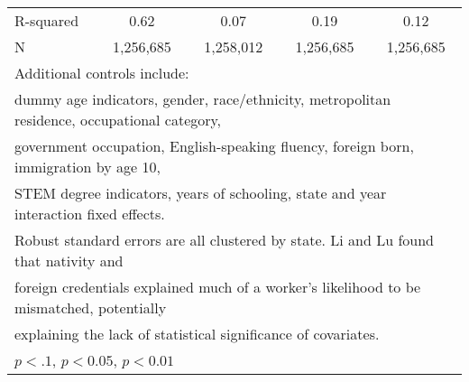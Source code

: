 \begin{table}[htbp]
\begin{tabular}{l*{4}{c}}
R-squared           &        0.62         &        0.07         &        0.19         &        0.12         \\
N                   &   1,256,685         &   1,258,012         &   1,256,685         &   1,256,685         \\
\bottomrule
\multicolumn{5}{l}{\footnotesize Additional controls include:}\\
\multicolumn{5}{l}{\footnotesize dummy age indicators, gender, race/ethnicity, metropolitan residence, occupational category,}\\
\multicolumn{5}{l}{\footnotesize government occupation, English-speaking fluency, foreign born, immigration by age 10,}\\
\multicolumn{5}{l}{\footnotesize STEM degree indicators, years of schooling, state and year interaction fixed effects.}\\
\multicolumn{5}{l}{\footnotesize Robust standard errors are all clustered by state. Li and Lu found that nativity and}\\
\multicolumn{5}{l}{\footnotesize foreign credentials explained much of a worker's likelihood to be mismatched, potentially}\\
\multicolumn{5}{l}{\footnotesize explaining the lack of statistical significance of covariates.}\\
\multicolumn{5}{l}{\footnotesize \sym{*} \(p<.1\), \sym{**} \(p<0.05\), \sym{***} \(p<0.01\)}\\
\end{tabular}
\end{table}
